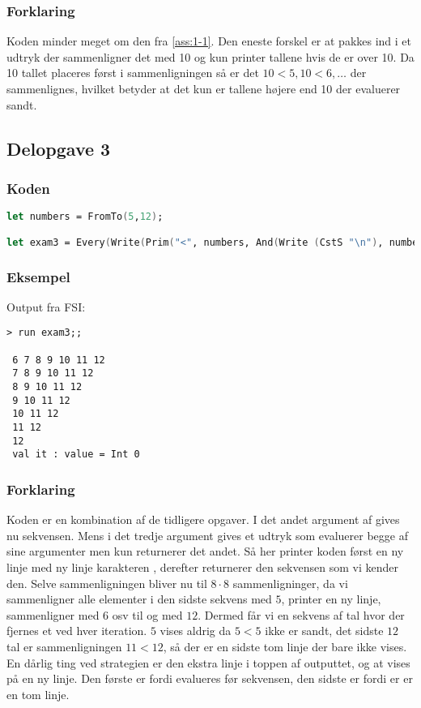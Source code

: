 \subsubsection{Forklaring}
Koden minder meget om den fra \ref{ass:1-1}. Den eneste forskel er at  pakkes ind i et  udtryk der sammenligner det med 10 og kun printer tallene hvis de er over 10. Da 10 tallet placeres først i sammenligningen så er det $10<5,10<6,\ldots$  der sammenlignes, hvilket betyder at det kun er tallene højere end 10 der evaluerer sandt.

\subsection{Delopgave 3}\label{ass:1-3}
\subsubsection{Koden}
\begin{lstlisting}[language=fsharp]
let numbers = FromTo(5,12);

let exam3 = Every(Write(Prim("<", numbers, And(Write (CstS "\n"), numbers))));
\end{lstlisting}

\subsubsection{Eksempel}
Output fra FSI:
\begin{lstlisting}
> run exam3;;

 6 7 8 9 10 11 12
 7 8 9 10 11 12
 8 9 10 11 12
 9 10 11 12
 10 11 12
 11 12
 12
 val it : value = Int 0
\end{lstlisting}

\subsubsection{Forklaring}
Koden er en kombination af de tidligere opgaver. I det andet argument af  gives nu sekvensen. Mens i det tredje argument gives et  udtryk som evaluerer begge af sine argumenter men kun returnerer det andet. Så her printer koden først en ny linje med ny linje karakteren \li{\\n}, derefter returnerer den  sekvensen som vi kender den. Selve sammenligningen bliver nu til $8\cdot8$ sammenligninger, da vi sammenligner alle elementer i den sidste sekvens med $5$, printer en ny linje, sammenligner med $6$ osv til og med $12$. Dermed får vi en sekvens af tal hvor der fjernes et ved hver iteration. $5$ vises aldrig da $5<5$ ikke er sandt, det sidste $12$ tal er sammenligningen $11<12$, så der er en sidste tom linje der bare ikke vises. En dårlig ting ved strategien er den ekstra linje i toppen af outputtet, og at  vises på en ny linje. Den første er fordi  evalueres før sekvensen, den sidste er fordi er er en tom linje.

